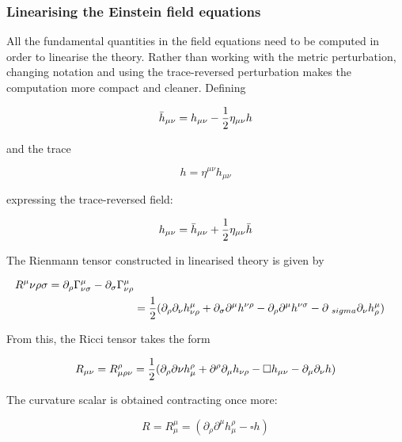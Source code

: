 \documentclass[binding=0.6cm, LaM]{sapthesis}
\begin{document}
\subsubsection{Linearising the Einstein field equations}

	All the fundamental quantities in the field equations need to be computed in order to linearise the theory.
	Rather than working with the metric perturbation, changing notation and using the trace-reversed perturbation 
	makes the computation more compact and cleaner. Defining
	
		\begin{equation}
		{\bar h}_{\mu\nu} = h_{\mu\nu} - {1 \over {2}}\eta_{\mu\nu}h  
		\end{equation}

	and the trace
	
		\begin{equation}
		h = \eta^{\mu\nu}h_{\mu\nu}
		\end{equation}

	expressing the trace-reversed field:

		\begin{equation}
		h_{\mu\nu} = {\bar h}_{\mu\nu} + {1 \over {2}}\eta_{\mu\nu}{\bar h}
		\end{equation}

	The Rienmann tensor constructed in linearised theory is given by

		\begin{align}
		R^{\mu}{\nu\rho\sigma} = \partial_{\rho} \Gamma^{\mu}_{\nu\sigma} - \partial_{\sigma}\Gamma^{\mu}_{\nu\rho}  \\
				      &={1 \over 2} (\partial_{\rho}\partial_{\nu}h^{\mu}_{\nu\rho} + \partial_{\sigma}\partial^{\mu}h^{\nu\rho} - \partial_{\rho}\partial^{\mu}h^{\nu\sigma} - \partial_{\					     sigma}\partial_{\nu}h^{\mu}_{\rho})
		\end{align}

	From this, the Ricci tensor takes the form

		\begin{equation}
		R_{\mu\nu} = R^{\rho}_{\mu\rho\nu} = {1 \over 2}(\partial_{\rho}\partial{\nu}h^{\rho}_{\mu} + \partial^{\rho}\partial_{\mu}h_{\nu\rho} - \square h_{\mu\nu} - \partial_{\mu}\partial_{\nu}h)
		\end{equation}

	The curvature scalar is obtained contracting once more:

		\begin{equation}
		R = R^{\mu}_{\mu} = (\partial_{\rho}\partial^{\mu}h^{\rho}_{\mu} - \square h)
		\end{equation}
\end{document}
